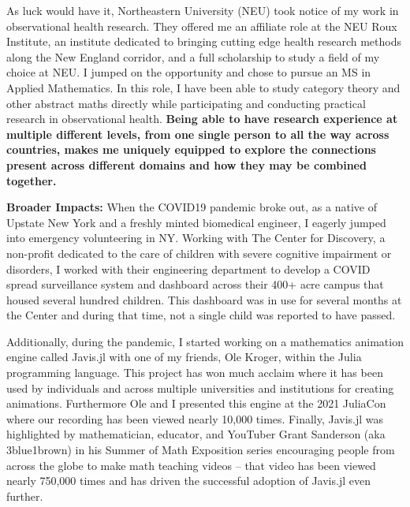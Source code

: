 \documentclass[11pt]{extarticle}
\begin{document}
As luck would have it, Northeastern University (NEU) took notice of my work in observational health research.
They offered me an affiliate role at the NEU Roux Institute, an institute dedicated to bringing cutting edge health research methods along the New England corridor, and a full scholarship to study a field of my choice at NEU.
I jumped on the opportunity and chose to pursue an MS in Applied Mathematics.
In this role, I have been able to study category theory and other abstract maths directly while participating and conducting practical research in observational health.
\textbf{Being able to have research experience at multiple different levels, from one single person to all the way across countries, makes me uniquely equipped to explore the connections present across different domains and how they may be combined together.}

\textbf{Broader Impacts:} When the COVID19 pandemic broke out, as a native of Upstate New York and a freshly minted biomedical engineer, I eagerly jumped into emergency volunteering in NY.
Working with The Center for Discovery, a non-profit dedicated to the care of children with severe cognitive impairment or disorders, I worked with their engineering department to develop a COVID spread surveillance system and dashboard across their 400+ acre campus that housed several hundred children.
This dashboard was in use for several months at the Center and during that time, not a single child was reported to have passed.

Additionally, during the pandemic, I started working on a mathematics animation engine called Javis.jl with one of my friends, Ole Kroger, within the Julia programming language.
This project has won much acclaim where it has been used by individuals and across multiple universities and institutions for creating animations.
Furthermore Ole and I presented this engine at the 2021 JuliaCon where our recording has been viewed nearly 10,000 times.
Finally, Javis.jl was highlighted by mathematician, educator, and YouTuber Grant Sanderson (aka 3blue1brown) in his Summer of Math Exposition series encouraging people from across the globe to make math teaching videos -- that video has been viewed nearly 750,000 times and has driven the successful adoption of Javis.jl even further.
\end{document}
